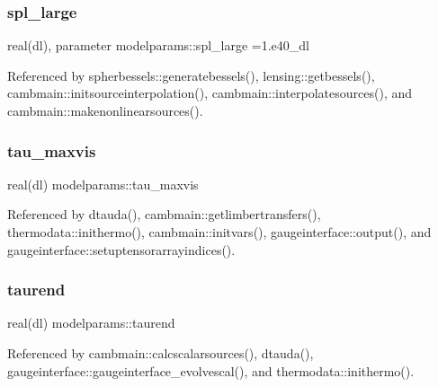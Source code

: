 \mbox{\label{namespacemodelparams_a1385cd79ec8a583c0e723a87e6dd5a78}} 
\subsubsection{\texorpdfstring{spl\+\_\+large}{spl\_large}}
{\footnotesize\ttfamily real(dl), parameter modelparams\+::spl\+\_\+large =1.e40\+\_\+dl}



Referenced by spherbessels\+::generatebessels(), lensing\+::getbessels(), cambmain\+::initsourceinterpolation(), cambmain\+::interpolatesources(), and cambmain\+::makenonlinearsources().

\mbox{\label{namespacemodelparams_a9d0fd2e2f02494b8ed27d6c924d7c494}} 
\subsubsection{\texorpdfstring{tau\+\_\+maxvis}{tau\_maxvis}}
{\footnotesize\ttfamily real(dl) modelparams\+::tau\+\_\+maxvis}



Referenced by dtauda(), cambmain\+::getlimbertransfers(), thermodata\+::inithermo(), cambmain\+::initvars(), gaugeinterface\+::output(), and gaugeinterface\+::setuptensorarrayindices().

\mbox{\label{namespacemodelparams_a914411aec3209257f74b174bae6b2a10}} 
\subsubsection{\texorpdfstring{taurend}{taurend}}
{\footnotesize\ttfamily real(dl) modelparams\+::taurend}



Referenced by cambmain\+::calcscalarsources(), dtauda(), gaugeinterface\+::gaugeinterface\+\_\+evolvescal(), and thermodata\+::inithermo().

\mbox{\label{namespacemodelparams_aa2deb415a6c7c9f406093a8c6853d01c}} 

